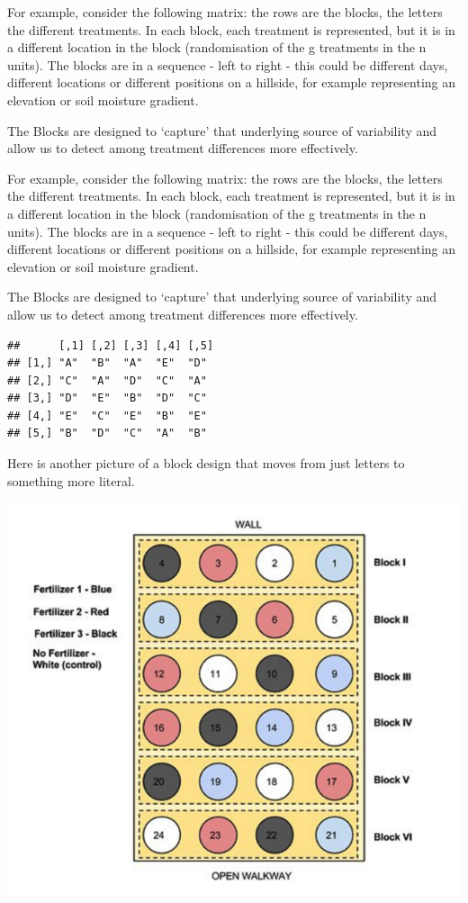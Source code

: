 \documentclass[
]{book}
\begin{document}
For example, consider the following matrix: the rows are the blocks, the letters the different treatments. In each block, each treatment is represented, but it is in a different location in the block (randomisation of the g treatments in the n units). The blocks are in a sequence - left to right - this could be different days, different locations or different positions on a hillside, for example representing an elevation or soil moisture gradient.

The Blocks are designed to `capture' that underlying source of variability and allow us to detect among treatment differences more effectively.

For example, consider the following matrix: the rows are the blocks, the letters the different treatments. In each block, each treatment is represented, but it is in a different location in the block (randomisation of the g treatments in the n units). The blocks are in a sequence - left to right - this could be different days, different locations or different positions on a hillside, for example representing an elevation or soil moisture gradient.

The Blocks are designed to `capture' that underlying source of variability and allow us to detect among treatment differences more effectively.

\begin{verbatim}
##      [,1] [,2] [,3] [,4] [,5]
## [1,] "A"  "B"  "A"  "E"  "D" 
## [2,] "C"  "A"  "D"  "C"  "A" 
## [3,] "D"  "E"  "B"  "D"  "C" 
## [4,] "E"  "C"  "E"  "B"  "E" 
## [5,] "B"  "D"  "C"  "A"  "B"
\end{verbatim}

Here is another picture of a block design that moves from just letters to something more literal.

\includegraphics[width=8.89in]{images/BlockDesignGraphic}
\end{document}
